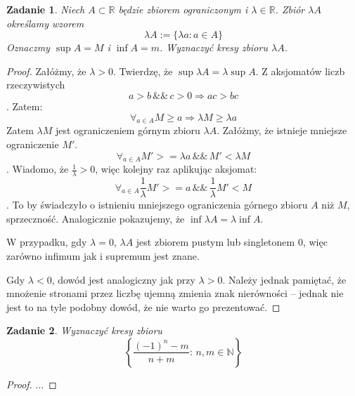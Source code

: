 \documentclass{article}
\newtheorem{problem}{Zadanie}
\begin{document}
\begin{problem}
    Niech $A \subset \mathbb{R}$ będzie zbiorem ograniczonym i
    $\lambda \in \mathbb{R}$. Zbiór $\lambda A$ określamy wzorem
    $$ \lambda A := \{ \lambda a : a \in A \} $$
    Oznaczmy $\sup A = M$ i $\inf A = m$. Wyznaczyć kresy zbioru
    $\lambda A$.
\end{problem}
\begin{proof}
    Załóżmy, że $\lambda > 0$.
    Twierdzę, że $\sup \lambda A = \lambda \sup A$.
    Z aksjomatów liczb rzeczywistych
    $$ a > b \,\&\&\, c > 0 \Rightarrow ac > bc $$.
    Zatem:
    $$ \forall_{a \in A} M \geq a \Rightarrow \lambda M \geq \lambda a$$
    Zatem $\lambda M$ jest ograniczeniem górnym zbioru $\lambda A$.
    Załóżmy, że istnieje mniejsze ograniczenie $M'$.
    $$ \forall_{a \in A} M' >= \lambda a \,\&\&\, M' < \lambda M $$.
    Wiadomo, że $\frac{1}{\lambda} > 0$, więc kolejny raz aplikując aksjomat:
    $$ \forall_{a \in A} \frac{1}{\lambda}M' >= a \,\&\&\, \frac{1}{\lambda}M' < M $$.
    To by świadczyło o istnieniu mniejszego ograniczenia górnego zbioru $A$ niż
    $M$, sprzeczność. Analogicznie pokazujemy, że $\inf \lambda A = \lambda \inf A$.

    W przypadku, gdy $\lambda = 0$, $\lambda A $ jest zbiorem pustym lub
    singletonem $0$, więc zarówno infimum jak i supremum jest znane.

    Gdy $\lambda < 0$, dowód jest analogiczny jak przy $\lambda > 0$.
    Należy jednak pamiętać, że mnożenie stronami przez liczbę ujemną
    zmienia znak nierówności -- jednak nie jest to na tyle podobny dowód, że
    nie warto go prezentować.
\end{proof}

\begin {problem}
Wyznaczyć kresy zbioru
$$ \left\{ \frac{(-1)^n - m}{n + m} : \, n,m \in \mathbb{N} \right\} $$
\end{problem}
\begin{proof}
$\ldots$
\end{proof}
\end{document}

